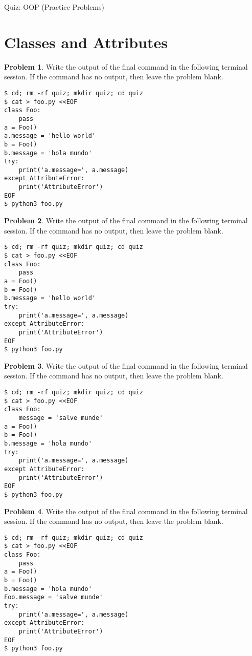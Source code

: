 \documentclass[10pt]{article}
\theoremstyle{definition}
\newtheorem{problem}{Problem}
\begin{document}
\begin{center}
    {
\Large
    Quiz: OOP (Practice Problems)
}

    \vspace{0.1in}
\end{center}

\filbreak
\section{Classes and Attributes}

\filbreak
\begin{problem}
    Write the output of the final command in the following terminal session.
    If the command has no output, then leave the problem blank.
\end{problem}
\begin{lstlisting}
$ cd; rm -rf quiz; mkdir quiz; cd quiz
$ cat > foo.py <<EOF
class Foo:
    pass
a = Foo()
a.message = 'hello world'
b = Foo()
b.message = 'hola mundo'
try:
    print('a.message=', a.message)
except AttributeError:
    print('AttributeError') 
EOF
$ python3 foo.py
\end{lstlisting}

\filbreak
\begin{problem}
    Write the output of the final command in the following terminal session.
    If the command has no output, then leave the problem blank.
\end{problem}
\begin{lstlisting}
$ cd; rm -rf quiz; mkdir quiz; cd quiz
$ cat > foo.py <<EOF
class Foo:
    pass
a = Foo()
b = Foo()
b.message = 'hello world'
try:
    print('a.message=', a.message)
except AttributeError:
    print('AttributeError') 
EOF
$ python3 foo.py
\end{lstlisting}


\filbreak
\begin{problem}
    Write the output of the final command in the following terminal session.
    If the command has no output, then leave the problem blank.
\end{problem}
\begin{lstlisting}
$ cd; rm -rf quiz; mkdir quiz; cd quiz
$ cat > foo.py <<EOF
class Foo:
    message = 'salve munde'
a = Foo()
b = Foo()
b.message = 'hola mundo'
try:
    print('a.message=', a.message)
except AttributeError:
    print('AttributeError') 
EOF
$ python3 foo.py
\end{lstlisting}


\filbreak
\begin{problem}
    Write the output of the final command in the following terminal session.
    If the command has no output, then leave the problem blank.
\end{problem}
\begin{lstlisting}
$ cd; rm -rf quiz; mkdir quiz; cd quiz
$ cat > foo.py <<EOF
class Foo:
    pass
a = Foo()
b = Foo()
b.message = 'hola mundo'
Foo.message = 'salve munde'
try:
    print('a.message=', a.message)
except AttributeError:
    print('AttributeError') 
EOF
$ python3 foo.py
\end{lstlisting}
\end{document}

